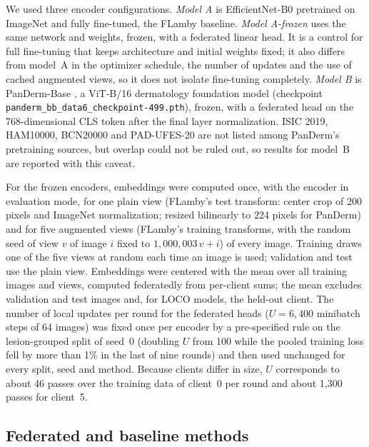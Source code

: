 \documentclass[VANCOUVER,Times1COL]{WileyNJDv5}
\begin{document}
We used three encoder configurations. \emph{Model A} is EfficientNet-B0 \cite{tan2019efficientnet}
pretrained on ImageNet \cite{deng2009imagenet} and fully fine-tuned, the FLamby baseline. \emph{Model
A-frozen} uses the same network and weights, frozen, with a federated linear head. It is a control for
full fine-tuning that keeps architecture and initial weights fixed; it also differs from model~A in the
optimizer schedule, the number of updates and the use of cached augmented views, so it does not isolate
fine-tuning completely. \emph{Model B} is PanDerm-Base \cite{yan2025panderm}, a ViT-B/16
\cite{dosovitskiy2021vit} dermatology foundation model (checkpoint
\texttt{panderm\_bb\_data6\_checkpoint-499.pth}), frozen, with a federated head on the 768-dimensional
CLS token after the final layer normalization. ISIC 2019, HAM10000, BCN20000 and PAD-UFES-20 are not
listed among PanDerm's pretraining sources, but overlap could not be ruled out, so results for model~B
are reported with this caveat.

For the frozen encoders, embeddings were computed once, with the encoder in evaluation mode, for one
plain view (FLamby's test transform: center crop of 200 pixels and ImageNet normalization; resized
bilinearly to 224 pixels for PanDerm) and for five augmented views (FLamby's training transforms, with
the random seed of view $v$ of image $i$ fixed to $1{,}000{,}003\,v+i$) of every image. Training draws one
of the five views at random each time an image is used; validation and test use the plain view.
Embeddings were centered with the mean over all training images and views, computed federatedly from
per-client sums; the mean excludes validation and test images and, for LOCO models, the held-out
client. The number of local updates per round for the federated heads ($U=6{,}400$ minibatch steps of 64
images) was fixed once per encoder by a pre-specified rule on the lesion-grouped split of seed~0
(doubling $U$ from 100 while the pooled training loss fell by more than 1\% in the last of nine rounds)
and then used unchanged for every split, seed and method. Because clients differ in size, $U$ corresponds
to about 46 passes over the training data of client~0 per round and about 1,300 passes for client~5.

\subsection{Federated and baseline methods}
\label{sec:methods-fl}
\end{document}
